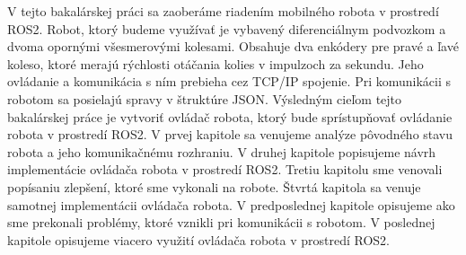 V tejto bakalárskej práci sa zaoberáme riadením mobilného robota v prostredí ROS2. Robot, ktorý budeme využívať
je vybavený diferenciálnym podvozkom a dvoma opornými všesmerovými kolesami. Obsahuje dva enkódery pre pravé
a ľavé koleso, ktoré merajú rýchlosti otáčania kolies v impulzoch za sekundu. Jeho ovládanie a komunikácia
s ním prebieha cez TCP/IP spojenie. Pri komunikácii s robotom sa posielajú spravy v štruktúre JSON.
Výsledným cieľom tejto bakalárskej práce je vytvoriť ovládač robota, ktorý bude sprístupňovať ovládanie robota
v prostredí ROS2. V prvej kapitole sa venujeme analýze pôvodného stavu robota a jeho komunikačnému rozhraniu.
V druhej kapitole popisujeme návrh implementácie ovládača robota v prostredí ROS2. Tretiu kapitolu sme venovali
popísaniu zlepšení, ktoré sme vykonali na robote. Štvrtá kapitola sa venuje samotnej implementácii ovládača robota.
V predposlednej kapitole opisujeme ako sme prekonali problémy, ktoré vznikli pri komunikácii s robotom. V poslednej
kapitole opisujeme viacero využití ovládača robota v prostredí ROS2.
